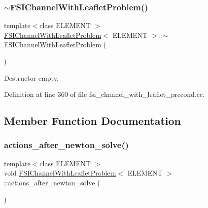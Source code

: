 \subsubsection{\texorpdfstring{$\sim$\+F\+S\+I\+Channel\+With\+Leaflet\+Problem()}{~FSIChannelWithLeafletProblem()}}
{\footnotesize\ttfamily template$<$class E\+L\+E\+M\+E\+NT $>$ \\
\hyperlink{classFSIChannelWithLeafletProblem}{F\+S\+I\+Channel\+With\+Leaflet\+Problem}$<$ E\+L\+E\+M\+E\+NT $>$\+::$\sim$\hyperlink{classFSIChannelWithLeafletProblem}{F\+S\+I\+Channel\+With\+Leaflet\+Problem} (\begin{DoxyParamCaption}{ }\end{DoxyParamCaption})\hspace{0.3cm}{\ttfamily [inline]}}



Destructor empty. 



Definition at line 360 of file fsi\+\_\+channel\+\_\+with\+\_\+leaflet\+\_\+precond.\+cc.



\subsection{Member Function Documentation}
\mbox{\label{classFSIChannelWithLeafletProblem_abff6e46a940263c9255a61f649bb4239}} 
\subsubsection{\texorpdfstring{actions\+\_\+after\+\_\+newton\+\_\+solve()}{actions\_after\_newton\_solve()}}
{\footnotesize\ttfamily template$<$class E\+L\+E\+M\+E\+NT $>$ \\
void \hyperlink{classFSIChannelWithLeafletProblem}{F\+S\+I\+Channel\+With\+Leaflet\+Problem}$<$ E\+L\+E\+M\+E\+NT $>$\+::actions\+\_\+after\+\_\+newton\+\_\+solve (\begin{DoxyParamCaption}{ }\end{DoxyParamCaption})\hspace{0.3cm}{\ttfamily [inline]}}



